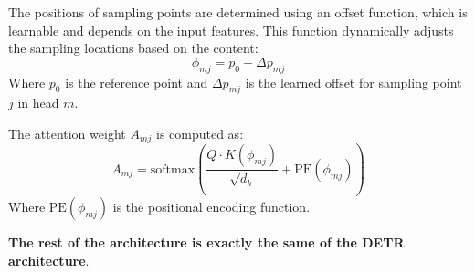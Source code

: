 \documentclass[12pt]{article}
\begin{document}
The positions of sampling points are determined using an offset function, which is learnable and depends on 
the input features. This function dynamically adjusts the sampling locations based on the content:
\begin{equation}
    \phi_{mj} = p_0 + \Delta p_{mj}
\end{equation}
Where $p_0$ is the reference point and $\Delta p_{mj}$ is the learned offset for sampling point $j$ 
in head $m$.

The attention weight $A_{mj}$ is computed as:
\begin{equation}
    A_{mj} = \text{softmax}\left(\frac{Q \cdot K(\phi_{mj})}{\sqrt{d_k}} + \text{PE}(\phi_{mj})\right)
\end{equation}
Where $\text{PE}(\phi_{mj})$ is the positional encoding function.

\textbf{The rest of the architecture is exactly the same of the DETR architecture}.
\end{document}
